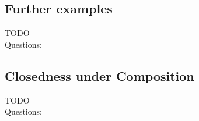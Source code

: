 \documentclass[a4]{scrartcl}
\begin{document}

\subsection*{Further examples}

\color{red} TODO \\
\color{black}
\color{violet} Questions:
\color{black}








\subsection*{Closedness under Composition}


\color{red} TODO \\
\color{black}
\color{violet} Questions:
\color{black}





\newpage

\printbibliography
\end{document}
